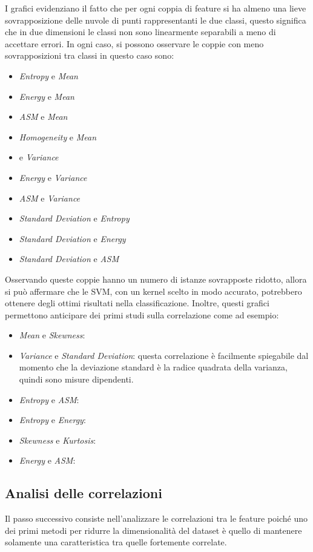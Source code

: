 I grafici evidenziano il fatto che per ogni coppia di feature si ha almeno una
lieve sovrapposizione delle nuvole di punti rappresentanti le due classi, questo
significa che in due dimensioni le classi non sono linearmente separabili a meno
di accettare errori. In ogni caso, si possono osservare le coppie con
meno sovrapposizioni tra classi in questo caso sono:
\begin{itemize}
      \item \textit{Entropy} e \textit{Mean}
      \item \textit{Energy} e \textit{Mean}
      \item \textit{ASM} e \textit{Mean}
      \item \textit{Homogeneity} e \textit{Mean}
      \item {} e \textit{Variance}
      \item \textit{Energy} e \textit{Variance}
      \item \textit{ASM} e \textit{Variance}
      \item \textit{Standard Deviation} e \textit{Entropy}
      \item \textit{Standard Deviation} e \textit{Energy}
      \item \textit{Standard Deviation} e \textit{ASM}
\end{itemize}
Osservando queste coppie hanno un numero di istanze sovrapposte ridotto, allora
si può affermare che le SVM, con un kernel scelto in modo accurato, potrebbero
ottenere degli ottimi risultati nella classificazione. Inoltre, questi grafici
permettono anticipare dei primi studi sulla correlazione come ad esempio:
\begin{itemize}
      \item \textit{Mean} e \textit{Skewness}:
      \item \textit{Variance} e \textit{Standard Deviation}: questa correlazione
            è facilmente spiegabile dal momento che la deviazione standard è la
            radice quadrata della varianza, quindi sono misure dipendenti.
      \item \textit{Entropy} e \textit{ASM}:
      \item \textit{Entropy} e \textit{Energy}:
      \item \textit{Skewness} e \textit{Kurtosis}:
      \item \textit{Energy} e \textit{ASM}:
\end{itemize}
\subsection{Analisi delle correlazioni} \label{sec:correlazione}
Il passo successivo consiste nell'analizzare le correlazioni tra le feature 
poiché uno dei primi metodi per ridurre la dimensionalità del dataset è quello 
di mantenere solamente una caratteristica tra quelle fortemente correlate.

